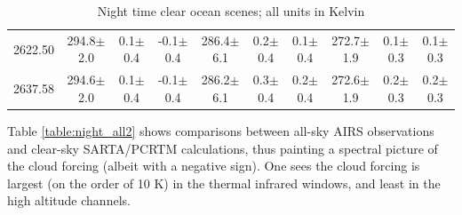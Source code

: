 \documentclass[agupp]{aguplus}              %
\begin{document}
\begin{article}
\begin{center}
\begin{table}[ht]
{\begin{tabular}{c|ccc|ccc|ccc}
2622.50 & 294.8$\pm$2.0 &  0.1$\pm$0.4 & -0.1$\pm$0.4 & 286.4$\pm$6.1 &  0.2$\pm$0.4 &  0.1$\pm$0.4 & 272.7$\pm$1.9 &  0.1$\pm$0.3 &  0.1$\pm$0.3 \\ 
2637.58 & 294.6$\pm$2.0 &  0.1$\pm$0.4 & -0.1$\pm$0.4 & 286.2$\pm$6.1 &  0.3$\pm$0.4 &  0.2$\pm$0.4 & 272.6$\pm$1.9 &  0.2$\pm$0.3 &  0.2$\pm$0.3 \\ 
\hline
\end{tabular}}
\hfill{}
\caption{Night time clear ocean scenes; all units in Kelvin}
\label{table:night_clear2} %
\end{table}
\end{center}



Table \ref{table:night_all2} shows comparisons between all-sky AIRS observations
and clear-sky SARTA/PCRTM calculations, thus painting a spectral picture of the 
cloud forcing (albeit with a negative sign). One sees the cloud forcing is largest
(on the order of 10 K) in the thermal infrared windows, and least in the high altitude channels. 


\end{article}
\end{document}
